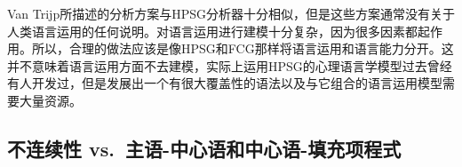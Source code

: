 
Van Trijp所描述的分析方案与HPSG分析器十分相似，但是这些方案通常没有关于人类语言运用的任何说明。对语言运用进行建模十分复杂，因为很多因素都起作用。所以，合理的做法应该是像HPSG和FCG那样将语言运用和语言能力分开。这并不意味着语言运用方面不去建模，实际上运用HPSG的心理语言学模型过去曾经有人开发过\citep{Konieczny96a-u}，但是发展出一个有很大覆盖性的语法以及与它组合的语言运用模型需要大量资源。

\subsection{不连续性 vs.\ 主语-中心语和中心语-填充项程式}

